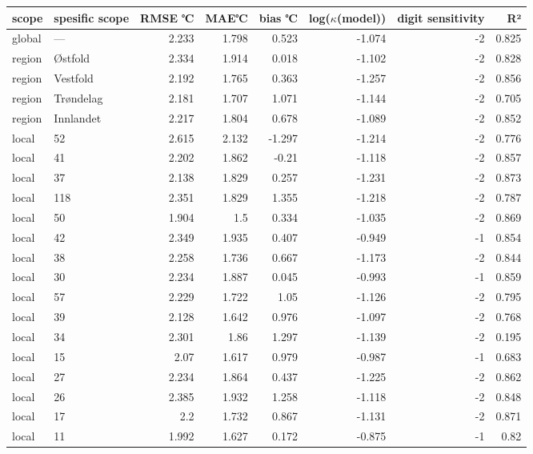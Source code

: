 \begin{tabular}{llrrrrrr}
\hline
 scope   & spesific
scope           &       RMSE
℃ &   MAE℃ &        bias
℃ &   log($\kappa$(model)) &    digit
sensitivity &    R² \\
\hline
 global  & ---       & 2.233 &  1.798 &  0.523 &                 -1.074 & -2 & 0.825 \\
 region  & Østfold   & 2.334 &  1.914 &  0.018 &                 -1.102 & -2 & 0.828 \\
 region  & Vestfold  & 2.192 &  1.765 &  0.363 &                 -1.257 & -2 & 0.856 \\
 region  & Trøndelag & 2.181 &  1.707 &  1.071 &                 -1.144 & -2 & 0.705 \\
 region  & Innlandet & 2.217 &  1.804 &  0.678 &                 -1.089 & -2 & 0.852 \\
 local   & 52        & 2.615 &  2.132 & -1.297 &                 -1.214 & -2 & 0.776 \\
 local   & 41        & 2.202 &  1.862 & -0.21  &                 -1.118 & -2 & 0.857 \\
 local   & 37        & 2.138 &  1.829 &  0.257 &                 -1.231 & -2 & 0.873 \\
 local   & 118       & 2.351 &  1.829 &  1.355 &                 -1.218 & -2 & 0.787 \\
 local   & 50        & 1.904 &  1.5   &  0.334 &                 -1.035 & -2 & 0.869 \\
 local   & 42        & 2.349 &  1.935 &  0.407 &                 -0.949 & -1 & 0.854 \\
 local   & 38        & 2.258 &  1.736 &  0.667 &                 -1.173 & -2 & 0.844 \\
 local   & 30        & 2.234 &  1.887 &  0.045 &                 -0.993 & -1 & 0.859 \\
 local   & 57        & 2.229 &  1.722 &  1.05  &                 -1.126 & -2 & 0.795 \\
 local   & 39        & 2.128 &  1.642 &  0.976 &                 -1.097 & -2 & 0.768 \\
 local   & 34        & 2.301 &  1.86  &  1.297 &                 -1.139 & -2 & 0.195 \\
 local   & 15        & 2.07  &  1.617 &  0.979 &                 -0.987 & -1 & 0.683 \\
 local   & 27        & 2.234 &  1.864 &  0.437 &                 -1.225 & -2 & 0.862 \\
 local   & 26        & 2.385 &  1.932 &  1.258 &                 -1.118 & -2 & 0.848 \\
 local   & 17        & 2.2   &  1.732 &  0.867 &                 -1.131 & -2 & 0.871 \\
 local   & 11        & 1.992 &  1.627 &  0.172 &                 -0.875 & -1 & 0.82  \\
\hline
\end{tabular}